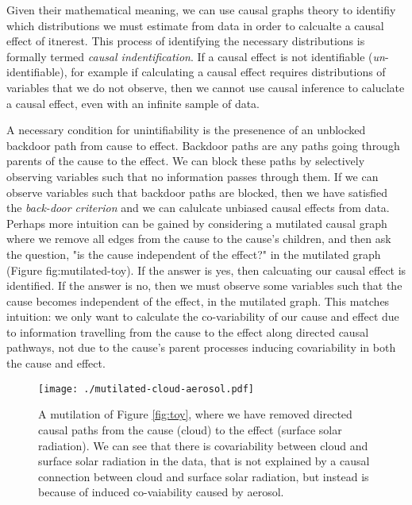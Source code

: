 \documentclass[12pt]{article}
\begin{document}

Given their mathematical meaning, we can use causal graphs theory
\citep[e.g.,][]{pearl1995causal,shpitser2006} to identifiy which
distributions we must estimate from data in order to calcualte a
causal effect of itnerest. This process of identifying the necessary
distributions is formally termed \emph{causal indentification}. If a
causal effect is not identifiable (\emph{un}-identifiable), for example if
calculating a causal effect requires distributions of variables that
we do not observe, then we cannot use causal inference to caluclate a
causal effect, even with an infinite sample of data.


A necessary condition for unintifiability is the presenence of an
unblocked backdoor path from cause to effect. Backdoor paths are any
paths going through parents of the cause to the effect. We can block
these paths by selectively observing variables such that no
information passes through them. If we can observe variables such that
backdoor paths are blocked, then we have satisfied the \emph{back-door
  criterion} and we can calulcate unbiased causal effects from
data. Perhaps more intuition can be gained by considering a mutilated
causal graph where we remove all edges from the cause to the cause's
children, and then ask the question, "is the cause independent of the
effect?" in the mutilated graph (Figure {fig:mutilated-toy}). If the
answer is yes, then calcuating our causal effect is identified. If the
answer is no, then we must observe some variables such that the cause
becomes independent of the effect, in the mutilated graph. This
matches intuition: we only want to calculate the co-variability of our
cause and effect due to information travelling from the cause to the
effect along directed causal pathways, not due to the cause's parent
processes inducing covariability in both the cause and effect.

\begin{figure}
  \noindent\texttt{[image: ./mutilated-cloud-aerosol.pdf]}\\
  \caption{A mutilation of Figure \ref{fig:toy}, where we have removed
    directed causal paths from the cause (cloud) to the effect (surface
    solar radiation). We can see that there is covariability between
    cloud and surface solar radiation in the data, that is not
    explained by a causal connection between cloud and surface solar
    radiation, but instead is because of induced co-vaiability caused
    by aerosol.}
  \label{fig:mutilated-toy}
\end{figure}
\end{document}
